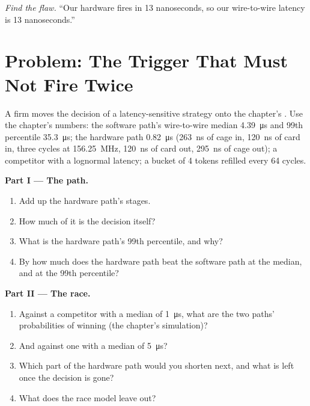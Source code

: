 \begin{exercise}[$\star\star\star$]\label{exo:nw:programmable-hardware-ii-trading-designs:8}
\emph{Find the flaw.} ``Our hardware fires in 13 nanoseconds, so our wire-to-wire latency is 13 nanoseconds.''
\end{exercise}

\section{Problem: The Trigger That Must Not Fire Twice}

\begin{problem}\label{pb:nw:programmable-hardware-ii-trading-designs:1}
A firm moves the decision of a latency-sensitive strategy onto the chapter's . Use the chapter's numbers: the software path's
wire-to-wire median \qty{4.39}{\micro\second} and 99th percentile \qty{35.3}{\micro\second}; the hardware path \qty{0.82}{\micro\second}
(\qty{263}{\nano\second} of cage in, \qty{120}{\nano\second} of card in, three cycles at 156.25~MHz, \qty{120}{\nano\second} of card out,
\qty{295}{\nano\second} of cage out); a competitor with a lognormal latency; a bucket of 4 tokens refilled every 64 cycles.

\medskip\noindent\textbf{Part I --- The path.}
\begin{enumerate}
\item Add up the hardware path's stages.
\item How much of it is the decision itself?
\item What is the hardware path's 99th percentile, and why?
\item By how much does the hardware path beat the software path at the median, and at the 99th percentile?
\end{enumerate}

\medskip\noindent\textbf{Part II --- The race.}
\begin{enumerate}[resume]
\item Against a competitor with a median of \qty{1}{\micro\second}, what are the two paths' probabilities of winning (the chapter's
  simulation)?
\item And against one with a median of \qty{5}{\micro\second}?
\item Which part of the hardware path would you shorten next, and what is left once the decision is gone?
\item What does the race model leave out?
\end{enumerate}


\end{problem}
